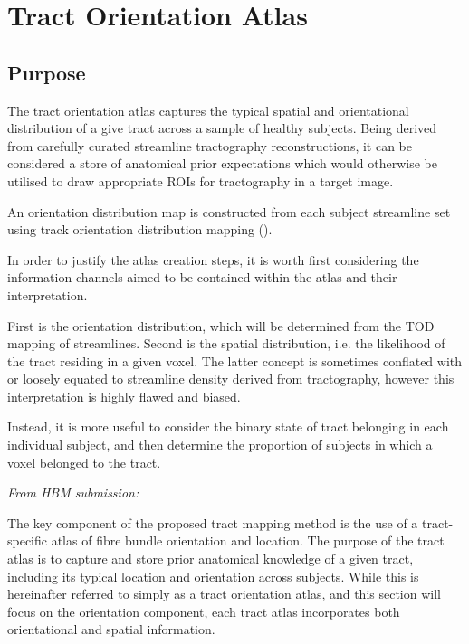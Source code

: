 \chapter{Tract Orientation Atlas}
\label{chapterlabel2}


\section{Purpose}


The tract orientation atlas captures the typical spatial and orientational distribution of a give tract across a sample of healthy subjects. Being derived from carefully curated streamline tractography reconstructions, it can be considered a store of anatomical prior expectations which would otherwise be utilised to draw appropriate ROIs for tractography in a target image.


An orientation distribution map is constructed from each subject streamline set using track orientation distribution mapping ().\autocite{Dhollander2014}

In order to justify the atlas creation steps, it is worth first considering the information channels aimed to be contained within the atlas and their interpretation.

First is the orientation distribution, which will be determined from the TOD mapping of streamlines.
Second is the spatial distribution, i.e. the likelihood of the tract residing in a given voxel.
The latter concept is sometimes conflated with or loosely equated to streamline density derived from tractography, however this interpretation is highly flawed and biased.

Instead, it is more useful to consider the binary state of tract belonging in each individual subject, and then determine the proportion of subjects in which a voxel belonged to the tract.

\textit{From HBM submission:}

The key component of the proposed tract mapping method is the use of a tract-specific atlas of fibre bundle orientation and location. The purpose of the tract atlas is to capture and store prior anatomical knowledge of a given tract, including its typical location and orientation across subjects.
While this is hereinafter referred to simply as a tract orientation atlas, and this section will focus on the orientation component, each tract atlas incorporates both orientational and spatial information.

